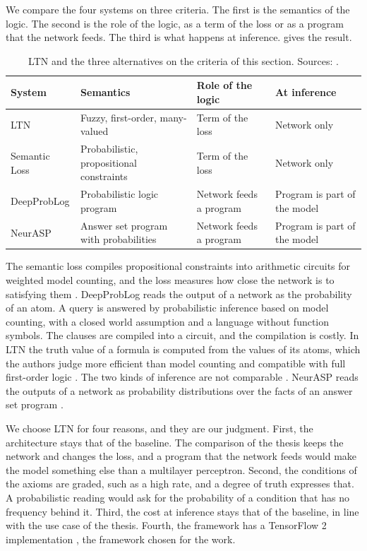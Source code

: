 We compare the four systems on three criteria. The first is the semantics of
the logic. The second is the role of the logic, as a term of the loss or as a
program that the network feeds. The third is what happens at inference.
 gives the result.

\begin{table}[htbp]
\centering
\footnotesize
\setlength{\tabcolsep}{3pt}
\caption{LTN and the three alternatives on the criteria of this section.
Sources: \citet{badreddine2022ltn,marra2024statistical,xu2018semantic,%
manhaeve2018deepproblog,yang2020neurasp}.}
\label{tab:ltn-alternatives}
\begin{tabular}{@{}p{2.1cm}p{3.3cm}p{3.5cm}p{3.1cm}@{}}
\toprule
System & Semantics & Role of the logic & At inference \\
\midrule
LTN & Fuzzy, first-order, many-valued & Term of the loss & Network only \\
Semantic Loss & Probabilistic, propositional constraints & Term of the loss & Network only \\
DeepProbLog & Probabilistic logic program & Network feeds a program & Program is part of the model \\
NeurASP & Answer set program with probabilities & Network feeds a program & Program is part of the model \\
\bottomrule
\end{tabular}
\end{table}

The semantic loss compiles propositional constraints into arithmetic circuits
for weighted model counting, and the loss measures how close the network is to
satisfying them \citep{badreddine2022ltn}. DeepProbLog
reads the output of a network as the probability of an atom. A query is
answered by probabilistic inference based on model counting, with a closed
world assumption and a language without function symbols. The clauses are
compiled into a circuit, and the compilation is costly. In LTN the truth value
of a formula is computed from the values of its atoms, which the authors judge
more efficient than model counting and compatible with full first-order logic
\citep{badreddine2022ltn}. The two kinds of inference are not comparable
\citep{badreddine2022ltn}. NeurASP reads the outputs of a network as
probability distributions over the facts of an answer set program
\citep{yang2020neurasp}.

We choose LTN for four reasons, and they are our judgment. First, the
architecture stays that of the baseline. The comparison of the thesis keeps the
network and changes the loss, and a program that the network feeds would
make the model something else than a multilayer perceptron. Second, the
conditions of the axioms are graded, such as a high rate, and a degree of truth
expresses that. A probabilistic reading would ask for the probability of a
condition that has no frequency behind it. Third, the cost at inference stays
that of the baseline, in line with the use case of the thesis. Fourth, the
framework has a TensorFlow 2 implementation \citep{badreddine2022ltn}, the
framework chosen for the work.

